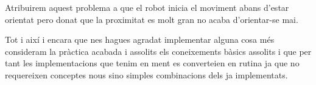 Atribuirem aquest problema a que el robot inicia el moviment abans d'estar orientat pero donat que la
proximitat es molt gran no acaba d'orientar-se mai.

Tot i així i encara que nes hagues agradat implementar alguna cosa més consideram la pràctica acabada
i assolits els coneixements bàsics assolits i que per tant les implementacions que tenim en ment
es converteien en rutina ja que no requereixen conceptes nous sino simples combinacions dels ja implementats.